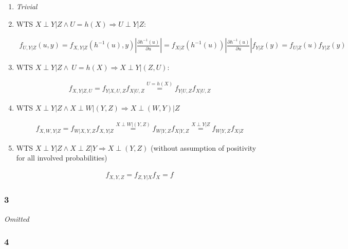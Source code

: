 \documentclass[11pt]{article}
\begin{document}
\begin{enumerate}[label=(\alph*)]
    \item \textit{Trivial} 
    
    \item WTS $X \perp Y|Z \land U=h(X) \Rightarrow U \perp Y | Z$:

    \begin{gather*}
        f_{U,Y|Z}(u,y) 
        =
        f_{X,Y|Z}(h^{-1}(u), y) \left| \frac{\partial h^{-1}(u)}{\partial u} \right|
        =
        f_{X|Z}(h^{-1}(u)) \left| \frac{\partial h^{-1}(u)}{\partial u} \right|
        f_{Y|Z}(y) 
        =
        f_{U|Z}(u)f_{Y|Z}(y)
    \end{gather*}
    

    \item 
    WTS $X\perp Y | Z \land \ U=h(X) \Rightarrow X \perp Y | (Z,U)$: 

    \begin{gather*}
    f_{X, Y | Z, U}
    =
    f_{Y|X, U, Z} f_{X|U, Z}
    \stackrel{U=h(X)}{=}
    f_{Y|U, Z} f_{X|U, Z}     
    \end{gather*}
    
    \item WTS $X \perp Y |Z \land X \perp W | (Y,Z) \Rightarrow X \perp (W,Y) | Z$

    \begin{gather*}
        f_{X, W, Y | Z} 
        =
        f_{W | X, Y, Z} f_{X, Y|Z}
        \stackrel{X \perp W | (Y, Z)}{=}
        f_{W | Y, Z} f_{X | Y, Z} 
        \stackrel{X \perp Y | Z}{=}
        f_{W | Y, Z} f_{X | Z} 
    \end{gather*}

    \item WTS $X \perp Y |Z \land X \perp Z |Y \Rightarrow X \perp (Y,Z)$ (without assumption of positivity for all involved probabilities)

    \begin{gather*}
        f_{X, Y, Z}
        =
        f_{Z, Y| X} f_X
        =
        f_{}
    \end{gather*}

\end{enumerate}

\subsubsection{3}

\textit{Omitted}

\subsubsection{4}
\end{document}
